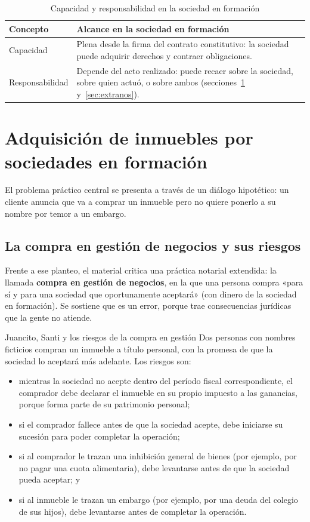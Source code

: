 \documentclass[12pt,oneside]{book}
\begin{document}
\begin{table}[H]
\centering
\caption{Capacidad y responsabilidad en la sociedad en formación}
\renewcommand{\arraystretch}{1.2}
\begin{tabularx}{\textwidth}{>{\raggedright\arraybackslash}p{}X}
\toprule
\textbf{Concepto} & \textbf{Alcance en la sociedad en formación} \\
\midrule
Capacidad & Plena desde la firma del contrato constitutivo: la sociedad puede adquirir derechos y contraer obligaciones. \\
Responsabilidad & Depende del acto realizado: puede recaer sobre la sociedad, sobre quien actuó, o sobre ambos (secciones~\ref{sec:adquisicion} y~\ref{sec:extranos}). \\
\bottomrule
\end{tabularx}
\end{table}

\section{Adquisición de inmuebles por sociedades en formación}
\label{sec:adquisicion}

El problema práctico central se presenta a través de un diálogo hipotético: un cliente anuncia que va a comprar un inmueble pero no quiere ponerlo a su nombre por temor a un embargo.

\subsection{La compra en gestión de negocios y sus riesgos}

Frente a ese planteo, el material critica una práctica notarial extendida: la llamada \textbf{compra en gestión de negocios}, en la que una persona compra «para sí y para una sociedad que oportunamente aceptará» (con dinero de la sociedad en formación). Se sostiene que es un error, porque trae consecuencias jurídicas que la gente no atiende.

\begin{example}{Juancito, Santi y los riesgos de la compra en gestión}
Dos personas con nombres ficticios compran un inmueble a título personal, con la promesa de que la sociedad lo aceptará más adelante. Los riesgos son:
\begin{itemize}
    \item mientras la sociedad no acepte dentro del período fiscal correspondiente, el comprador debe declarar el inmueble en su propio impuesto a las ganancias, porque forma parte de su patrimonio personal;
    \item si el comprador fallece antes de que la sociedad acepte, debe iniciarse su sucesión para poder completar la operación;
    \item si al comprador le trazan una inhibición general de bienes (por ejemplo, por no pagar una cuota alimentaria), debe levantarse antes de que la sociedad pueda aceptar; y
    \item si al inmueble le trazan un embargo (por ejemplo, por una deuda del colegio de sus hijos), debe levantarse antes de completar la operación.
\end{itemize}
\end{example}
\end{document}
